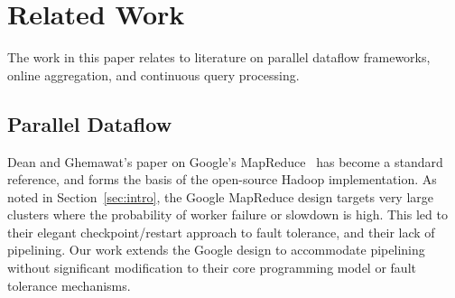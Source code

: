 


\section{Related Work}
\label{sec:relwork}
The work in this paper relates to literature on parallel dataflow frameworks, online aggregation, and continuous query processing.

\subsection{Parallel Dataflow}
Dean and Ghemawat's paper on Google's MapReduce~\cite{mapreduce-osdi}
has become a standard reference, and forms the basis of the
open-source Hadoop implementation.  As noted in
Section~\ref{sec:intro}, the Google MapReduce design targets very
large clusters where the probability of worker failure or slowdown is
high.  This led to their elegant checkpoint/restart approach to fault
tolerance, and their lack of pipelining.  Our work
extends the Google design to accommodate pipelining without significant
modification to their core programming model or fault tolerance
mechanisms.

